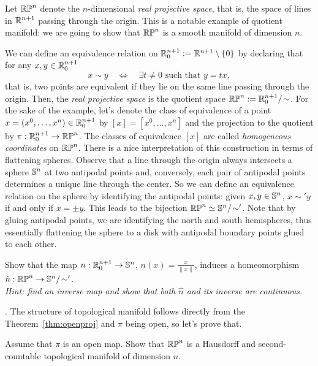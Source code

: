 \begin{example}
	Let $\mathbb{RP}^n$ denote the $n$-dimensional \emph{real projective space}, that is, the space of lines in $\mathbb{R}^{n+1}$ passing through the origin.
	This is a notable example of quotient manifold: we are going to show that $\mathbb{RP}^n$ is a smooth manifold of dimension $n$.

	We can define an equivalence relation on $\mathbb{R}^{n+1}_0:=\mathbb{R}^{n+1}\setminus\{0\}$ by declaring that for any $x,y\in \mathbb{R}^{n+1}_0$
	\begin{equation}
		x\sim y \quad\Longleftrightarrow\quad \exists t\neq 0 \mbox{ such that } y=tx,
	\end{equation}
	that is, two points are equivalent if they lie on the same line passing through the origin.
	Then, the \emph{real projective space} is the quotient space $\mathbb{RP}^n := \mathbb{R}^{n+1}_0/\!\sim$.
	For the sake of the example, let's denote the class of equivalence of a point $x=(x^0,\ldots,x^n)\in\mathbb{R}^{n+1}_0$ by $[x]=[x^0,\ldots,x^n]$ and the projection to the quotient by $\pi:\mathbb{R}^{n+1}_0\to\mathbb{RP}^n$.
	The classes of equivalence $[x]$ are called \emph{homogeneous coordinates} on $\mathbb{RP}^n$.
	There is a nice interpretation of this construction in terms of flattening spheres.
	Observe that a line through the origin always intersects a sphere $\mathbb{S}^n$ at two antipodal points and, conversely, each pair of antipodal points determines a unique line through the center.
	So we can define an equivalence relation on the sphere by identifying the antipodal points: given $x,y\in\mathbb{S}^n$, $x\sim' y$ if and only if $x = \pm y$.
	This leads to the bijection $\mathbb{RP}^n \simeq \mathbb{S}^n/\!\sim'$.
	Note that by gluing antipodal points, we are identifying the north and south hemispheres, thus essentially flattening the sphere to a disk with antipodal boundary points glued to each other.

	\begin{exercise}\label{exe:RPSN}
		Show that the map $n: \mathbb{R}^{n+1}_0\to \mathbb{S}^n$, $n(x) = \frac{x}{\|x\|}$, induces a homeomorphism $\hat n:\mathbb{RP}^n \to \mathbb{S}^n/\!\sim'$.\\
		\textit{\small Hint: find an inverse map and show that both $\hat n$ and its inverse are continuous.}
	\end{exercise}

	.
	The structure of topological manifold follows directly from the Theorem~\ref{thm:openproj} and $\pi$ being open, so let's prove that.

	\begin{exercise}\label{exe:RPnmanifold}
		Assume that $\pi$ is an open map. Show that $\mathbb{RP}^n$ is a Hausdorff and second-countable topological manifold of dimension $n$.
	\end{exercise}


\end{example}
